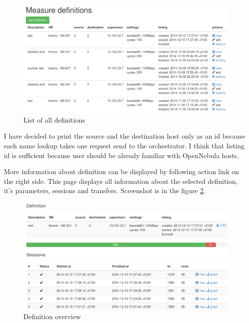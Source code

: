 \begin{figure}[htb]
	\begin{center}
	\includegraphics[width=\textwidth]{themis-definitions.png}
	\end{center}
	\caption{List of all definitions}
	\label{img:themis-definitions}
\end{figure}

I have decided to print the source and the destination host only as an id because each name lookup takes one request send to the orchestrator. I think that listing id is sufficient because user should be already familiar with OpenNebula hosts. 

More information about definition can be displayed by following  action link on the right side. This page displays all information about the selected definition, it's parameters, sessions and transfers. Screenshot is in the figure \ref{img:themis-definition}.

\begin{figure}[htb]
	\begin{center}
	\includegraphics[width=\textwidth]{themis-definition.png}
	\end{center}
	\caption{Definition overview}
	\label{img:themis-definition}
\end{figure}

